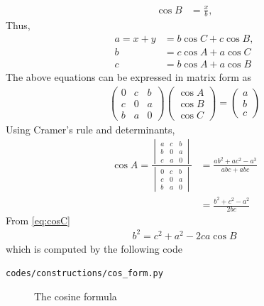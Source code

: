 \begin{enumerate}[label=\arabic*.,ref=\thesubsection.\theenumi]
\begin{align}
\\
\cos B &= \frac{x}{b},
\end{align}
%
Thus, 
%
\begin{align}
a=x+y &= b \cos C + c \cos B, \\
b &= c \cos A + a \cos C \\
c &= b \cos A + a \cos B
\end{align}
%
  The above equations can be expressed in matrix form as
%
\begin{align}
\begin{pmatrix}
0 & c & b \\
c & 0 & a \\
b & a & 0
\end{pmatrix}
\begin{pmatrix}
\cos A \\
\cos B \\
\cos C
\end{pmatrix}
= 
\begin{pmatrix}
a\\
b\\
c
\end{pmatrix}
\end{align}
%
Using Cramer's rule and determinants,
%
\begin{align}
\cos A = \frac{
\begin{vmatrix}
a & c & b \\
b & 0 & a \\
c & a & 0
\end{vmatrix}
	}
	{
\begin{vmatrix}
0 & c & b \\
c & 0 & a \\
b & a & 0
\end{vmatrix}
	}
	&=\frac{ab^2 + ac^2 - a^3}{abc + abc} 
\\
&= \frac{b^2 + c^2 - a^2}{2bc}
\label{eq:cosC}
\end{align}
From \eqref{eq:cosC}
\begin{align}
\label{eq:b_cos_form}
b^2 = c^2+a^2-2ca\cos B
\end{align}
which is computed by the following code
\begin{lstlisting}
codes/constructions/cos_form.py
\end{lstlisting}
%
\begin{figure}[!ht]
	\begin{center}
		
		\resizebox{\columnwidth}{!}{}
	\end{center}
	\caption{The cosine formula}
	\label{ch2_cosine_formula}	
\end{figure}


\end{enumerate}
